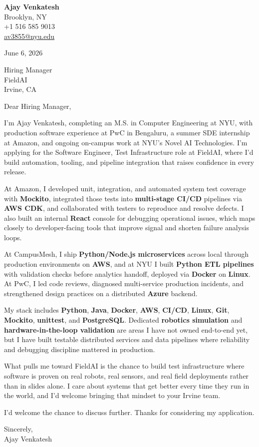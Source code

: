 \documentclass[letterpaper,11pt]{article}
\begin{document}
\begin{flushleft}
\textbf{\large Ajay Venkatesh} \\
Brooklyn, NY \\
+1 516 585 9013 \\
\href{mailto:av3855@nyu.edu}{av3855@nyu.edu}
\end{flushleft}
\vspace{10pt}
June 6, 2026
\vspace{6pt}

Hiring Manager \\
FieldAI \\
Irvine, CA

\vspace{10pt}

Dear Hiring Manager,

I'm Ajay Venkatesh, completing an M.S. in Computer Engineering at NYU, with production software experience at PwC in Bengaluru, a summer SDE internship at Amazon, and ongoing on-campus work at NYU's Novel AI Technologies. I'm applying for the Software Engineer, Test Infrastructure role at FieldAI, where I'd build automation, tooling, and pipeline integration that raises confidence in every release.

At Amazon, I developed unit, integration, and automated system test coverage with \textbf{Mockito}, integrated those tests into \textbf{multi-stage CI/CD} pipelines via \textbf{AWS CDK}, and collaborated with testers to reproduce and resolve defects. I also built an internal \textbf{React} console for debugging operational issues, which maps closely to developer-facing tools that improve signal and shorten failure analysis loops.

At CampusMesh, I ship \textbf{Python/Node.js microservices} across local through production environments on \textbf{AWS}, and at NYU I built \textbf{Python ETL pipelines} with validation checks before analytics handoff, deployed via \textbf{Docker} on \textbf{Linux}. At PwC, I led code reviews, diagnosed multi-service production incidents, and strengthened design practices on a distributed \textbf{Azure} backend.

My stack includes \textbf{Python}, \textbf{Java}, \textbf{Docker}, \textbf{AWS}, \textbf{CI/CD}, \textbf{Linux}, \textbf{Git}, \textbf{Mockito}, \textbf{unittest}, and \textbf{PostgreSQL}. Dedicated \textbf{robotics simulation} and \textbf{hardware-in-the-loop validation} are areas I have not owned end-to-end yet, but I have built testable distributed services and data pipelines where reliability and debugging discipline mattered in production.

What pulls me toward FieldAI is the chance to build test infrastructure where software is proven on real robots, real sensors, and real field deployments rather than in slides alone. I care about systems that get better every time they run in the world, and I'd welcome bringing that mindset to your Irvine team.

I'd welcome the chance to discuss further. Thanks for considering my application.

\vspace{12pt}
Sincerely, \\
Ajay Venkatesh
\end{document}
